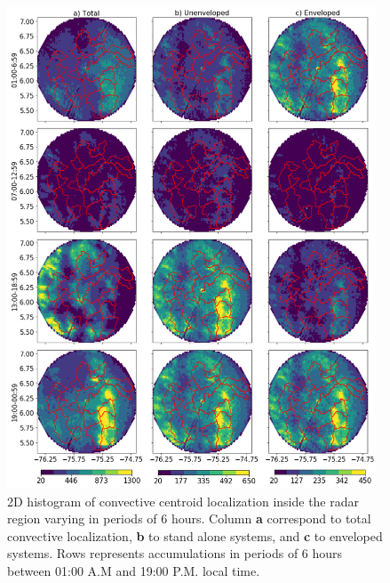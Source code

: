 \documentclass[preprint,12pt]{elsarticle}
\begin{document}
\begin{figure}[!h]
\centering
  \includegraphics[width=11cm]{Figuras/Localization_conv_evolVsNotEvol_tiempoZoom.png}
  \caption{2D histogram of convective centroid localization inside the radar region varying in periods of 6 hours.  Column \textbf{a} correspond to total convective localization, \textbf{b} to stand alone systems, and \textbf{c} to enveloped systems.  Rows represents accumulations in periods of 6 hours between 01:00 A.M and 19:00 P.M. local time.}
  \label{fig:ConvectiveSpatialDistributionHourly}
\end{figure}


\end{document}
